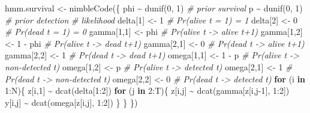 \documentclass[
  12pt,
]{krantz}
\newenvironment{Shaded}{\begin{snugshade}}{\end{snugshade}}
\newcommand{\CommentTok}[1]{\textcolor[rgb]{0.56,0.35,0.01}{\textit{#1}}}
\newcommand{\ControlFlowTok}[1]{\textcolor[rgb]{0.13,0.29,0.53}{\textbf{#1}}}
\newcommand{\DecValTok}[1]{\textcolor[rgb]{0.00,0.00,0.81}{#1}}
\newcommand{\FunctionTok}[1]{\textcolor[rgb]{0.00,0.00,0.00}{#1}}
\newcommand{\NormalTok}[1]{#1}
\newcommand{\OtherTok}[1]{\textcolor[rgb]{0.56,0.35,0.01}{#1}}
\newcommand{\SpecialCharTok}[1]{\textcolor[rgb]{0.00,0.00,0.00}{#1}}
\begin{document}
\begin{Shaded}
\begin{Highlighting}[]
\NormalTok{hmm.survival }\OtherTok{\textless{}{-}} \FunctionTok{nimbleCode}\NormalTok{(\{}
\NormalTok{  phi }\SpecialCharTok{\textasciitilde{}} \FunctionTok{dunif}\NormalTok{(}\DecValTok{0}\NormalTok{, }\DecValTok{1}\NormalTok{) }\CommentTok{\# prior survival}
\NormalTok{  p }\SpecialCharTok{\textasciitilde{}} \FunctionTok{dunif}\NormalTok{(}\DecValTok{0}\NormalTok{, }\DecValTok{1}\NormalTok{) }\CommentTok{\# prior detection}
  \CommentTok{\# likelihood}
\NormalTok{  delta[}\DecValTok{1}\NormalTok{] }\OtherTok{\textless{}{-}} \DecValTok{1}          \CommentTok{\# Pr(alive t = 1) = 1}
\NormalTok{  delta[}\DecValTok{2}\NormalTok{] }\OtherTok{\textless{}{-}} \DecValTok{0}          \CommentTok{\# Pr(dead t = 1) = 0}
\NormalTok{  gamma[}\DecValTok{1}\NormalTok{,}\DecValTok{1}\NormalTok{] }\OtherTok{\textless{}{-}}\NormalTok{ phi      }\CommentTok{\# Pr(alive t {-}\textgreater{} alive t+1)}
\NormalTok{  gamma[}\DecValTok{1}\NormalTok{,}\DecValTok{2}\NormalTok{] }\OtherTok{\textless{}{-}} \DecValTok{1} \SpecialCharTok{{-}}\NormalTok{ phi  }\CommentTok{\# Pr(alive t {-}\textgreater{} dead t+1)}
\NormalTok{  gamma[}\DecValTok{2}\NormalTok{,}\DecValTok{1}\NormalTok{] }\OtherTok{\textless{}{-}} \DecValTok{0}        \CommentTok{\# Pr(dead t {-}\textgreater{} alive t+1)}
\NormalTok{  gamma[}\DecValTok{2}\NormalTok{,}\DecValTok{2}\NormalTok{] }\OtherTok{\textless{}{-}} \DecValTok{1}        \CommentTok{\# Pr(dead t {-}\textgreater{} dead t+1)}
\NormalTok{  omega[}\DecValTok{1}\NormalTok{,}\DecValTok{1}\NormalTok{] }\OtherTok{\textless{}{-}} \DecValTok{1} \SpecialCharTok{{-}}\NormalTok{ p    }\CommentTok{\# Pr(alive t {-}\textgreater{} non{-}detected t)}
\NormalTok{  omega[}\DecValTok{1}\NormalTok{,}\DecValTok{2}\NormalTok{] }\OtherTok{\textless{}{-}}\NormalTok{ p        }\CommentTok{\# Pr(alive t {-}\textgreater{} detected t)}
\NormalTok{  omega[}\DecValTok{2}\NormalTok{,}\DecValTok{1}\NormalTok{] }\OtherTok{\textless{}{-}} \DecValTok{1}        \CommentTok{\# Pr(dead t {-}\textgreater{} non{-}detected t)}
\NormalTok{  omega[}\DecValTok{2}\NormalTok{,}\DecValTok{2}\NormalTok{] }\OtherTok{\textless{}{-}} \DecValTok{0}        \CommentTok{\# Pr(dead t {-}\textgreater{} detected t)}
  \ControlFlowTok{for}\NormalTok{ (i }\ControlFlowTok{in} \DecValTok{1}\SpecialCharTok{:}\NormalTok{N)\{}
\NormalTok{    z[i,}\DecValTok{1}\NormalTok{] }\SpecialCharTok{\textasciitilde{}} \FunctionTok{dcat}\NormalTok{(delta[}\DecValTok{1}\SpecialCharTok{:}\DecValTok{2}\NormalTok{])}
    \ControlFlowTok{for}\NormalTok{ (j }\ControlFlowTok{in} \DecValTok{2}\SpecialCharTok{:}\NormalTok{T)\{}
\NormalTok{      z[i,j] }\SpecialCharTok{\textasciitilde{}} \FunctionTok{dcat}\NormalTok{(gamma[z[i,j}\DecValTok{{-}1}\NormalTok{], }\DecValTok{1}\SpecialCharTok{:}\DecValTok{2}\NormalTok{])}
\NormalTok{      y[i,j] }\SpecialCharTok{\textasciitilde{}} \FunctionTok{dcat}\NormalTok{(omega[z[i,j], }\DecValTok{1}\SpecialCharTok{:}\DecValTok{2}\NormalTok{])}
\NormalTok{    \}}
\NormalTok{  \}}
\NormalTok{\})}
\end{Highlighting}
\end{Shaded}
\end{document}
